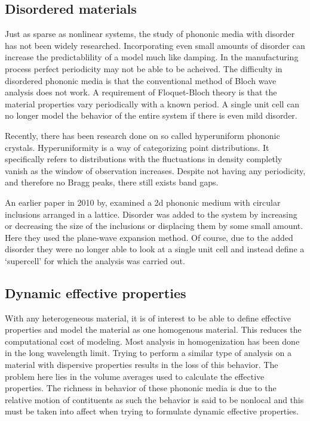 \documentclass{article}
\begin{document}
\subsection{Disordered materials}
Just as sparse as nonlinear systems, the study of phononic media with disorder 
has not been widely researched. Incorporating even small amounts of disorder 
can increase the predictablility of a model much like damping. In the 
manufacturing process perfect periodicity may not be able to be acheived. The 
difficulty in disordered phononic media is that the conventional method of 
Bloch wave analysis does not work. A requirement of Floquet-Bloch theory is 
that the material properties vary periodically with a known period. A single 
unit cell can no longer model the behavior of the entire system if there is 
even mild disorder.

Recently, there has been research done on so called hyperuniform phononic 
crystals. Hyperuniformity is a way of categorizing point distributions. It 
specifically refers to distributions with the fluctuations in density completly 
vanish as the window of observation increases. Despite not having any 
periodicity, and therefore no Bragg peaks, there still exists band gaps.

An earlier paper in 2010 by, examined a 2d phononic medium with circular 
inclusions arranged in a lattice. Disorder was added to the system by 
increasing or decreasing the size of the inclusions or displacing them by some 
small amount. Here they used the plane-wave expansion method. Of course, due to 
the added disorder they were no longer able to look at a single unit cell and 
instead define a `supercell' for which the analysis was carried out. 

\subsection{Dynamic effective properties}
With any heterogeneous material, it is of interest to be able to define 
effective properties and model the material as one homogenous material. This 
reduces the computational cost of modeling. Most analysis in homogenization has 
been done in the long wavelength limit. Trying to perform a similar type of 
analysis on a material with dispersive properties results in the loss of this 
behavior. The problem here lies in the volume averages used to calculate the 
effective properties. The richness in behavior of these phononic media is due 
to the relative motion of contituents as such the behavior is said to be 
nonlocal and this must be taken into affect when trying to formulate dynamic 
effective properties.
\end{document}
